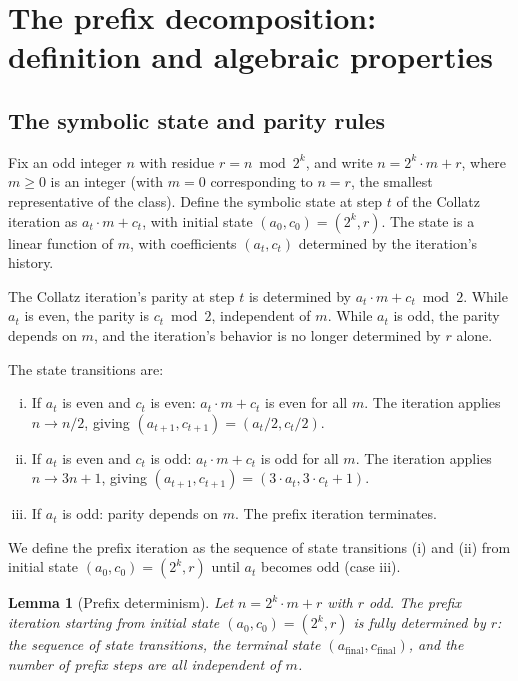 \documentclass[pdflatex,sn-mathphys-num]{sn-jnl}
\theoremstyle{thmstyleone}%
\newtheorem{lemma}[theorem]{Lemma}
\theoremstyle{definition}
\theoremstyle{plain}
\begin{document}
\section{The prefix decomposition: definition and algebraic properties}
\label{sec:prefix}
\subsection{The symbolic state and parity rules}
\label{subsec:prefix-recall}
Fix an odd integer $n$ with residue $r = n \bmod 2^k$, and write $n = 2^k \cdot m + r$, where $m \geq 0$ is an integer (with $m = 0$ corresponding to $n = r$, the smallest representative of the class). Define the symbolic state at step $t$ of the Collatz iteration as $a_t \cdot m + c_t$, with initial state $(a_0, c_0) = (2^k, r)$. The state is a linear function of $m$, with coefficients $(a_t, c_t)$ determined by the iteration's history.

The Collatz iteration's parity at step $t$ is determined by $a_t \cdot m + c_t \bmod 2$. While $a_t$ is even, the parity is $c_t \bmod 2$, independent of $m$. While $a_t$ is odd, the parity depends on $m$, and the iteration's behavior is no longer determined by $r$ alone.

The state transitions are:
\begin{enumerate}[(i)]
    \item If $a_t$ is even and $c_t$ is even: $a_t \cdot m + c_t$ is even for all $m$. The iteration applies $n \rightarrow n/2$, giving $(a_{t+1}, c_{t+1}) = (a_t/2, c_t/ 2)$.
    \item If $a_t$ is even and $c_t$ is odd: $a_t \cdot m + c_t$ is odd for all $m$. The iteration applies $n \rightarrow 3n+1$, giving $(a_{t+1}, c_{t+1}) = (3 \cdot a_t, 3 \cdot c_t + 1)$.
    \item If $a_t$ is odd: parity depends on $m$. The prefix iteration terminates.
\end{enumerate}

We define the prefix iteration as the sequence of state transitions (i) and (ii) from initial state $(a_0, c_0) = (2^k, r)$ until $a_t$ becomes odd (case iii).

\begin{lemma}[Prefix determinism]
\label{lem:prefix-determinism}
Let $n=2^k \cdot m + r$ with $r$ odd. The prefix iteration starting from initial state $(a_0, c_0) = (2^k, r)$ is fully determined by $r$: the sequence of state transitions, the terminal state $(a_{\text{final}}, c_{\text{final}})$, and the number of prefix steps are all independent of $m$.
\end{lemma}
\end{document}

